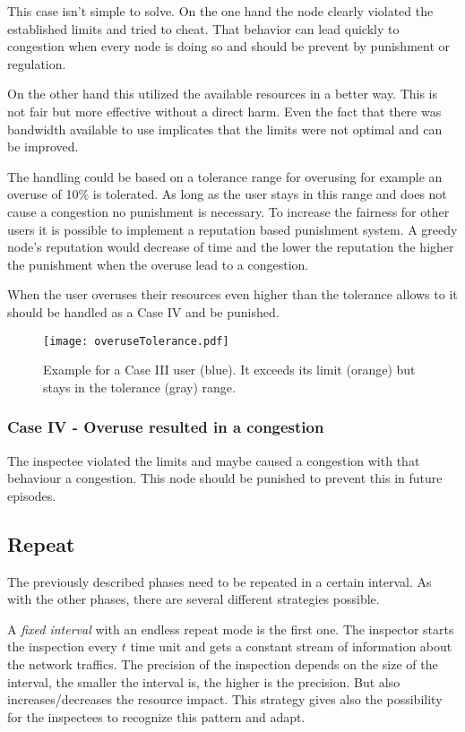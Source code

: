 \documentclass[thesis.tex]{subfiles}
\begin{document}
This case isn't simple to solve. On the one hand the node clearly violated the established limits and tried to cheat. That behavior can lead quickly to congestion when every node is doing so and should be prevent by punishment or regulation.

On the other hand this utilized the available resources in a better way. This is not fair but more effective without a direct harm. Even the fact that there was bandwidth available to use implicates that the limits were not optimal and can be improved.

The handling could be based on a tolerance range for overusing for example an overuse of 10\% is tolerated. As long as the user stays in this range and does not cause a congestion no punishment is necessary. To increase the fairness for other users it is possible to implement a reputation based punishment system. A greedy node's reputation would decrease of time and the lower the reputation the higher the punishment when the overuse lead to a congestion.

When the user overuses their resources even higher than the tolerance allows to it should be handled as a Case IV and be punished.

\begin{figure}[h]
	\centering
	\texttt{[image: overuseTolerance.pdf]}
	\caption{Example for a Case III user (blue). It exceeds its limit (orange) but stays in the tolerance (gray) range.}
	\label{fig:main:caseIII}
\end{figure}

\subsubsection{Case IV - Overuse resulted in a congestion}
The inspectee violated the limits and maybe caused a congestion with that behaviour a congestion. This node should be punished to prevent this in future episodes.
\newpage
\subsection{Repeat} \label{sec:main:repeatphase}
The previously described phases need to be repeated in a certain interval. As with the other phases, there are several different strategies possible.

A \textit{fixed interval} with an endless repeat mode is the first one. The inspector starts the inspection every $t$ time unit and gets a constant stream of information about the network traffics. The precision of the inspection depends on the size of the interval, the smaller the interval is, the higher is the precision. But also increases/decreases the resource impact. This strategy gives also the possibility for the inspectees to recognize this pattern and adapt.
\end{document}
